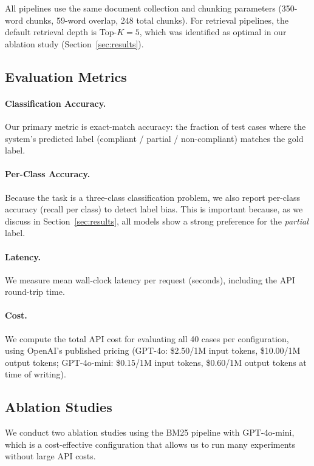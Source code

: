 All pipelines use the same document collection and chunking parameters (350-word chunks, 59-word overlap, 248 total chunks). For retrieval pipelines, the default retrieval depth is Top-$K = 5$, which was identified as optimal in our ablation study (Section~\ref{sec:results}).

\subsection{Evaluation Metrics}

\paragraph{Classification Accuracy.} Our primary metric is exact-match accuracy: the fraction of test cases where the system's predicted label (compliant / partial / non-compliant) matches the gold label.

\paragraph{Per-Class Accuracy.} Because the task is a three-class classification problem, we also report per-class accuracy (recall per class) to detect label bias. This is important because, as we discuss in Section~\ref{sec:results}, all models show a strong preference for the \textit{partial} label.

\paragraph{Latency.} We measure mean wall-clock latency per request (seconds), including the API round-trip time.

\paragraph{Cost.} We compute the total API cost for evaluating all 40 cases per configuration, using OpenAI's published pricing (GPT-4o: \$2.50/1M input tokens, \$10.00/1M output tokens; GPT-4o-mini: \$0.15/1M input tokens, \$0.60/1M output tokens at time of writing).

\subsection{Ablation Studies}

We conduct two ablation studies using the BM25 pipeline with GPT-4o-mini, which is a cost-effective configuration that allows us to run many experiments without large API costs.


